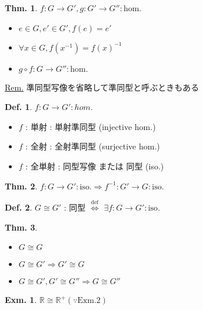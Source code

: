\documentclass[uplatex,dvipdfmx,9pt]{beamer}
\newcommand{\defarrow}{\overset{\mathrm{def}}{\Leftrightarrow}}
\newcommand{\inverse}[1]{#1^{-1}}
\newcounter{textExmCount}
\theoremstyle{definition} %
\newtheorem{defn}{Def.}[subsection] %
\newtheorem{thm}{Thm.}[subsection] %
\theoremstyle{example}
\newtheorem{exmText}[textExmCount]{Exm.}
\begin{document}
      \begin{frame}

        \begin{thm}
          $f\colon G \to G', g: G' \to G'' : \text{hom.}$

          \begin{itemize}
            \item $e \in G, e' \in G', f(e) = e'$
            \item $\forall x \in G, f(\inverse{x}) = \inverse{f(x)}$
            \item $g \circ f : G \to G'' : \text{hom.}$
          \end{itemize}
          
        \end{thm}
        \underline{Rem.} 準同型写像を省略して準同型と呼ぶときもある

        \begin{defn}
          $f\colon G \to G' : hom.$

          \begin{itemize}
            \item $f$ : 単射 : \alert{単射準同型} (injective hom.)
            \item $f$ : 全射 : \alert{全射準同型} (surjective hom.)
            \item $f$ : 全単射 : \alert{同型写像} または \alert{同型} (iso.)
          \end{itemize}
        \end{defn}

        \begin{thm}
          $f\colon G \to G' : \text{iso.} \Rightarrow \inverse{f}\colon G' \to G : \text{iso.}$
        \end{thm}
          
      \end{frame}

      \begin{frame}
        
        \begin{defn}
          $G \cong G'$ : \alert{同型} $\defarrow$ $\exists f\colon G \to G' : \text{iso.}$
        \end{defn}

        \begin{thm}
          \begin{itemize}
            \item $G \cong G$
            \item $G \cong G' \Rightarrow G' \cong G$
            \item $G \cong G', G' \cong G'' \Rightarrow G \cong G''$
          \end{itemize}
        \end{thm}

        \begin{exmText}
          $\mathbb{R} \cong \mathbb{R}^+ (\because \text{Exm.2})$
        \end{exmText}

      \end{frame}
\end{document}
